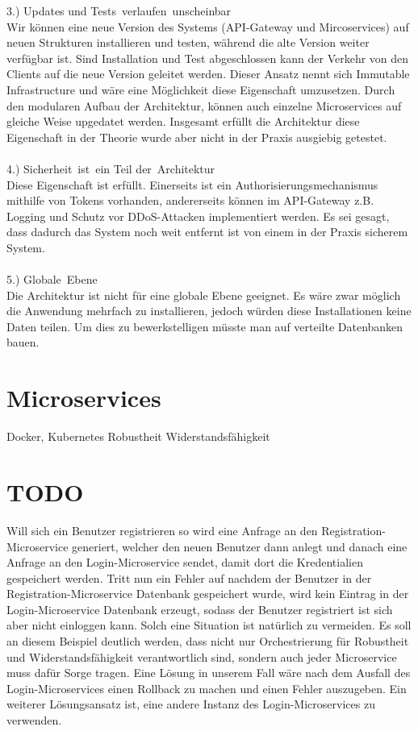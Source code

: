 3.) Updates und Tests verlaufen unscheinbar\\
Wir können eine neue Version des Systems (API-Gateway und Mircoservices) auf neuen Strukturen installieren und testen, während die alte Version weiter verfügbar ist. Sind Installation und Test abgeschlossen kann der Verkehr von den Clients auf die neue Version geleitet werden. Dieser Ansatz nennt sich Immutable Infrastructure und wäre eine Möglichkeit diese Eigenschaft umzusetzen. Durch den modularen Aufbau der Architektur, können auch einzelne Microservices auf gleiche Weise upgedatet werden. Insgesamt erfüllt die Architektur diese Eigenschaft in der Theorie wurde aber nicht in der Praxis ausgiebig getestet.\\
\\
4.) Sicherheit ist ein Teil der Architektur\\
Diese Eigenschaft ist erfüllt. Einerseits ist ein Authorisierungsmechanismus mithilfe von Tokens vorhanden, andererseits können im API-Gateway z.B. Logging und Schutz vor DDoS-Attacken implementiert werden. Es sei gesagt, dass dadurch das System noch weit entfernt ist von einem in der Praxis sicherem System.\\
\\
5.) Globale Ebene\\
Die Architektur ist nicht für eine globale Ebene geeignet. Es wäre zwar möglich die Anwendung mehrfach zu installieren, jedoch würden diese Installationen keine Daten teilen. Um dies zu bewerkstelligen müsste man auf verteilte Datenbanken bauen.

\section{Microservices}
 Docker, Kubernetes
 Robustheit
 Widerstandsfähigkeit
 
 \section{TODO}
 Will sich ein Benutzer registrieren so wird eine Anfrage an den Registration-Microservice generiert, welcher den neuen Benutzer dann anlegt und danach eine Anfrage an den Login-Microservice sendet, damit dort die Kredentialien gespeichert werden. Tritt nun ein Fehler auf nachdem der Benutzer in der Registration-Microservice Datenbank gespeichert wurde, wird kein Eintrag in der Login-Microservice Datenbank erzeugt, sodass der Benutzer registriert ist sich aber nicht einloggen kann. Solch eine Situation ist natürlich zu vermeiden. Es soll an diesem Beispiel deutlich werden, dass nicht nur Orchestrierung für Robustheit und Widerstandsfähigkeit verantwortlich sind, sondern auch jeder Microservice muss dafür Sorge tragen. Eine Lösung in unserem Fall wäre nach dem Ausfall des Login-Microservices einen Rollback zu machen und einen Fehler auszugeben. Ein weiterer Lösungsansatz ist, eine andere Instanz des Login-Microservices zu verwenden.
 
